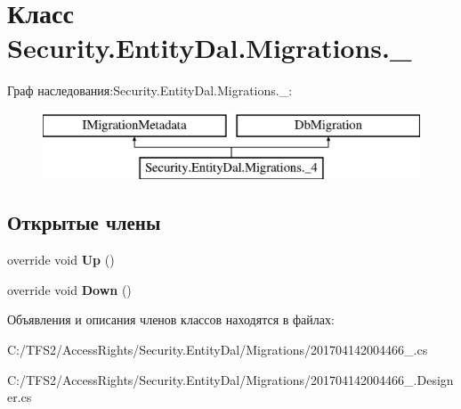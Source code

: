 \hypertarget{class_security_1_1_entity_dal_1_1_migrations_1_1__4}{}\section{Класс Security.\+Entity\+Dal.\+Migrations.\+\_}
\label{class_security_1_1_entity_dal_1_1_migrations_1_1__4}
Граф наследования\+:Security.\+Entity\+Dal.\+Migrations.\+\_\+:\begin{figure}[H]
\begin{center}
\leavevmode
\includegraphics[height=2.000000cm]{de/df1/class_security_1_1_entity_dal_1_1_migrations_1_1__4}
\end{center}
\end{figure}
\subsection*{Открытые члены}
\begin{DoxyCompactItemize}
\item 
\mbox{\label{class_security_1_1_entity_dal_1_1_migrations_1_1__4_a447686e6b93ad266b0fc4c40d5be0218}} 
override void {\bfseries Up} ()
\item 
\mbox{\label{class_security_1_1_entity_dal_1_1_migrations_1_1__4_ae176833e4077ba6b07416280317ae6f3}} 
override void {\bfseries Down} ()
\end{DoxyCompactItemize}


Объявления и описания членов классов находятся в файлах\+:\begin{DoxyCompactItemize}
\item 
C\+:/\+T\+F\+S2/\+Access\+Rights/\+Security.\+Entity\+Dal/\+Migrations/201704142004466\+\_.\+cs\item 
C\+:/\+T\+F\+S2/\+Access\+Rights/\+Security.\+Entity\+Dal/\+Migrations/201704142004466\+\_.\+Designer.\+cs\end{DoxyCompactItemize}
